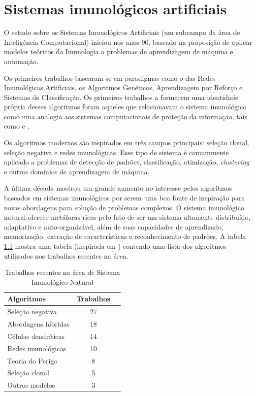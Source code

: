 \chapter{Sistemas imunológicos artificiais}

O estudo sobre os Sistemas Imunológicos Artificiais (um subcampo da área de Inteligência Computacional) iniciou nos anos 90, baseado na proposição de aplicar modelos teóricos da Imunologia a problemas de aprendizagem de máquina e automação.

Os primeiros trabalhos basearam-se em paradigmas como o das Redes Imunológicas Artificiais, os Algoritmos Genéticos, Aprendizagem por Reforço e Sistemas de Classificação. Os primeiros trabalhos a formarem uma identidade própria desses algoritmos foram aqueles que relacionavam o sistema imunológico como uma analogia aos sistemas computacionais de proteção da informação, tais como \citet{Forrest1994} e \citet{Forrest1997}.

Os algoritmos modernos são inspirados em três campos principais: seleção clonal, seleção negativa e redes imunológicas. Esse tipo de sistema é comummente aplicado a problemas de detecção de padrões, classificação, otimização, \emph{clustering} e outros domínios de aprendizagem de máquina.

A última década mostrou um grande aumento no interesse pelos algoritmos baseados em sistemas imunológicos por serem uma boa fonte de inspiração para novas abordagens para solução de problemas complexos. O sistema imunológico natural oferece metáforas ricas pelo fato de ser um sistema altamente distribuído, adaptativo e auto-organizável, além de suas capacidades de aprendizado, memorização, extração de características e reconhecimento de padrões. A tabela \ref{ais:recent} mostra uma tabela (inspirada em \citet{Dasgupta2010}) contendo uma lista dos algoritmos utilizados nos trabalhos recentes na área.

\vspace{2mm}
\begin{table}[h!]
    \centering
    \begin{tabular}{l c r}
        \hline
        Algoritmos & Trabalhos   \\
        \hline
        Seleção negativa    & 27 \\
        Abordagens híbridas & 18 \\
        Células dendríticas & 14 \\
        Redes imunológicas  & 10 \\
        Teoria do Perigo    & 8  \\
        Seleção clonal      & 5  \\
        Outros modelos      & 3  \\
        \hline
    \end{tabular}
    \label{ais:recent}
    \caption{Trabalhos recentes na área de Sistema Imunológico Natural \cite{Dasgupta2010}}
\end{table}
\vspace{2mm}

